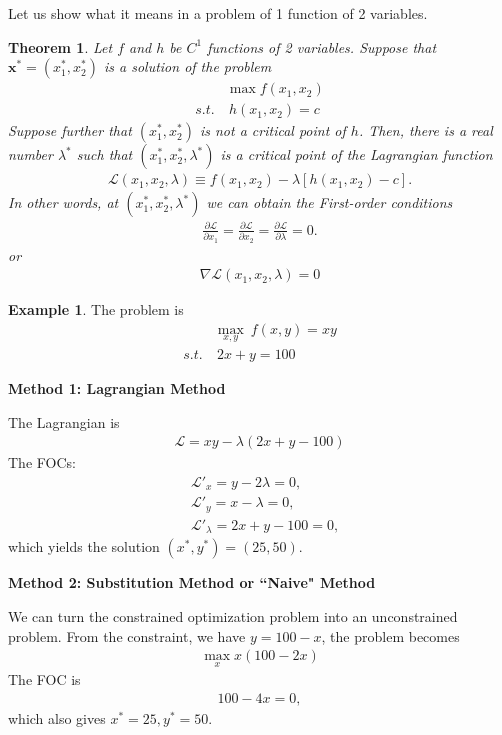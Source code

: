 \documentclass[11pt,a4paper]{book}
\newtheorem{theorem}{Theorem}[section]
\theoremstyle{definition}\newtheorem{definition}{Definition}
\theoremstyle{definition}\newtheorem{fact}{Fact}
\theoremstyle{definition}\newtheorem{remark}{Remark}
\theoremstyle{definition}\newtheorem{ex}{Ex.}
\theoremstyle{definition}\newtheorem{project}{Project}
\theoremstyle{definition}\newtheorem{problem}{Problem}
\theoremstyle{definition}\newtheorem{example}{Example}
\newenvironment{ftheorem}
{\begin{mdframed}\begin{theorem}}
		{\end{theorem}\end{mdframed}}
\numberwithin{theorem}{section}
\numberwithin{corollary}{chapter}
\numberwithin{assumption}{chapter}
\numberwithin{definition}{chapter}
\numberwithin{prop}{chapter}
\numberwithin{notation}{chapter}
\numberwithin{problem}{chapter}
\numberwithin{example}{chapter}
\numberwithin{fact}{chapter}
\numberwithin{ex}{chapter}
\def\x{\mathbf x}
\begin{document}
	Let us show what it means in a problem of 1 function of 2 variables.
		\begin{ftheorem}
		Let $f$ and $h$ be $C^1$ functions of 2 variables. Suppose that $\x^* = (x^*_1, x^*_2)$ is a solution of the problem
		\begin{align*}
			& \max f(x_1,x_2)   \\
			s.t. & \ h(x_1, x_2) = c 
		\end{align*}
		Suppose further that $(x^*_1, x^*_2)$ is not a critical point of $h$. Then, there is a real number $\lambda^*$ such that $(x^*_1, x^*_2, \lambda^*)$ is a critical point of the Lagrangian function
		\begin{align*}
			\mathcal{L} (x_1, x_2, \lambda) \equiv f(x_1, x_2) - \lambda [ h(x_1, x_2) - c]. 
		\end{align*}
		In other words, at $(x^*_1, x^*_2, \lambda^*)$ we can obtain the First-order conditions 
		\begin{align*}
			\frac{\partial \mathcal{L}}{\partial x_1} = 
			\frac{\partial \mathcal{L}}{\partial x_2} = 
			\frac{\partial \mathcal{L}}{\partial \lambda} = 0.
		\end{align*}
		or
		\begin{align*}
			\nabla \mathcal{L} (x_1, x_2, \lambda) = 0
		\end{align*}
	\end{ftheorem}
	
		\begin{example}
		The problem is
		\begin{align*}
			& \max_{x,y} \ f(x,y) = xy \\
			s.t. & \ 2x + y = 100           
		\end{align*}
		
		\textbf{Method 1: Lagrangian Method}
		
		
		The Lagrangian is
		\begin{align*}
			\mathcal{L} = xy - \lambda (2x + y - 100) 
		\end{align*}
		The FOCs:
		\begin{align*}
			& \mathcal{L}'_x = y - 2\lambda = 0,       \\
			& \mathcal{L}'_y = x - \lambda = 0,        \\
			& \mathcal{L}'_\lambda = 2x + y - 100 = 0, 
		\end{align*}
		which yields the solution $(x^*,y^*) = (25,50)$. 
		
		\textbf{Method 2: Substitution Method or ``Naive" Method}
		
		
		We can turn the constrained optimization problem into an unconstrained problem. From the constraint, we have $y = 100 -x$, the problem becomes
		\begin{align*}
			\max_{x} x (100-2x) 
		\end{align*}
		The FOC is
		\begin{align*}
			100 - 4x = 0, 
		\end{align*}
		which also gives $x^*=25, y^* = 50$.
		
	\end{example}
\end{document}
